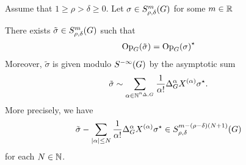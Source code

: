 \begin{theorem}
\label{theorem:adjunction_formula}
    Assume that $1 \geq \rho > \delta \geq 0$.
    Let
    $\sigma \in S^{m}_{\rho, \delta}(G)$ for some $m \in \mathbb{R}$

    There exists $\tilde \sigma \in S^{m}_{\rho, \delta}(G)$ such that
    \begin{align*}
        \mathrm{Op}_{G} (\tilde \sigma) = {\mathrm{Op}_{G}(\sigma)}^\star
    \end{align*}
    Moreover,
    $\tilde \sigma$ is given modulo ${S^{-\infty} (G)}$ by the asymptotic sum
    \begin{align*}
        \tilde \sigma \sim
        \sum_{\alpha \in \mathbb{N}^{n_{\Delta, G}}} \frac 1 {\alpha!} {\Delta_{G}^{\alpha}} X^{(\alpha)} {\sigma}^\star.
    \end{align*}
    More precisely,
    we have
    \begin{align*}
        \tilde \sigma
        - \sum_{\left|{\alpha}\right| \leq N} \frac 1 {\alpha!} {\Delta_{G}^{\alpha}} X^{(\alpha)} {\sigma}^\star \in S^{m - (\rho - \delta) (N + 1)}_{\rho, \delta}(G)
    \end{align*}
    for each $N \in \mathbb{N}$.
\end{theorem}
